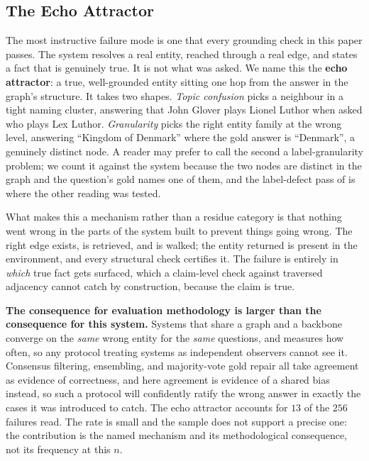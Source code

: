 \subsection{The Echo Attractor}\label{sec:echo}

The most instructive failure mode is one that every grounding check in
this paper passes. The system resolves a real entity, reached through a
real edge, and states a fact that is genuinely true. It is not what was
asked. We name this the \textbf{echo attractor}: a true, well-grounded
entity sitting one hop from the answer in the graph's structure. It
takes two shapes. \emph{Topic confusion} picks a neighbour in a tight
naming cluster, answering that John Glover plays Lionel Luthor when
asked who plays Lex Luthor. \emph{Granularity} picks the right entity
family at the wrong level, answering ``Kingdom of Denmark'' where the
gold answer is ``Denmark'', a genuinely distinct node. A reader may
prefer to call the second a label-granularity problem; we count it
against the system because the two nodes are distinct in the graph and
the question's gold names one of them, and the label-defect pass of
 is where the other reading was tested.

What makes this a mechanism rather than a residue category is that
nothing went wrong in the parts of the system built to prevent things
going wrong. The right edge exists, is retrieved, and is walked; the
entity returned is present in the environment, and every structural
check certifies it. The failure is entirely in \emph{which} true fact
gets surfaced, which a claim-level check against traversed adjacency
cannot catch by construction, because the claim is true.

\textbf{The consequence for evaluation methodology is larger than the
consequence for this system.} Systems that share a graph and a backbone
converge on the \emph{same} wrong entity for the \emph{same} questions,
and  measures how often, so any protocol treating
systems as independent observers cannot see it. Consensus filtering,
ensembling, and majority-vote gold repair all take agreement as evidence
of correctness, and here agreement is evidence of a shared bias instead,
so such a protocol will confidently ratify the wrong answer in exactly
the cases it was introduced to catch. The echo attractor accounts for
$13$ of the $256$ failures read. The rate is small and the sample does
not support a precise one: the contribution is the named mechanism and
its methodological consequence, not its frequency at this $n$.

